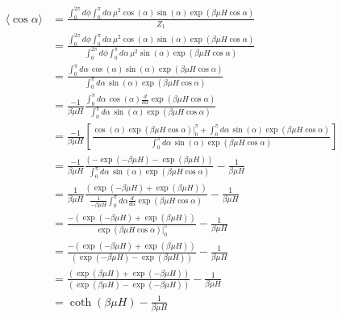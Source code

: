 \documentclass[11pt, letterpaper]{scrartcl} %
\numberwithin{equation}{section} %
\numberwithin{figure}{section} %
\numberwithin{table}{section} %
\begin{document}
\begin{align}
  \langle \cos \alpha \rangle &= \frac{\int_0^{2\pi} d\phi \int_0^\pi d\alpha \, \mu^2 \cos(\alpha) \sin (\alpha) \exp( \beta\mu H \cos \alpha)} {Z_1} \\
                              &= \frac{ \int_0^{2\pi} d\phi \int_0^\pi d\alpha \, \mu^2 \cos(\alpha) \sin(\alpha) \exp( \beta\mu H \cos \alpha)}
                                {\int_0^{2\pi} d\phi \int_0^\pi d\alpha \, \mu^2 \sin (\alpha) \exp( \beta\mu H \cos \alpha)} \\
                              &= \frac{\int_0^\pi d\alpha \, \cos(\alpha) \sin(\alpha) \exp( \beta\mu H \cos \alpha)}
                                {\int_0^\pi d\alpha \, \sin (\alpha) \exp( \beta\mu H \cos \alpha)} \\
                              &= \frac{-1}{\beta\mu H} \frac{\int_0^\pi d\alpha \, \cos(\alpha) \frac{d}{d\alpha} \exp( \beta\mu H \cos \alpha)}
                                {\int_0^\pi d\alpha \, \sin (\alpha) \exp( \beta\mu H \cos \alpha)} \\
                              &= \frac{-1}{\beta\mu H} \left[ \frac{ \cos (\alpha) \exp(\beta\mu H \cos \alpha) |_0^\pi + \int_0^\pi d\alpha \, \sin(\alpha) \exp( \beta\mu H \cos \alpha)}
                                {\int_0^\pi d\alpha \, \sin (\alpha) \exp( \beta\mu H \cos \alpha)} \right] \\
                              &= \frac{-1}{\beta\mu H} \frac{\left( -\exp(-\beta\mu H) - \exp(\beta\mu H)  \right)}
                                {\int_0^\pi d\alpha \, \sin (\alpha) \exp( \beta\mu H \cos \alpha)} - \frac{1}{\beta\mu H} \\
                              &= \frac{1}{\beta\mu H} \frac{\left( \exp(-\beta\mu H) + \exp(\beta\mu H)  \right)}
                                {\frac{1}{-\beta\mu H} \int_0^\pi d\alpha \frac{d}{d\alpha} \exp( \beta\mu H \cos \alpha)} - \frac{1}{\beta\mu H} \\
                              &= \frac{-\left( \exp(-\beta\mu H) + \exp(\beta\mu H)  \right)}
                                {\exp( \beta\mu H \cos \alpha) |_0^\pi } - \frac{1}{\beta\mu H} \\
                              &= \frac{-\left( \exp(-\beta\mu H) + \exp(\beta\mu H)  \right)}
                                {\left( \exp(-\beta\mu H) - \exp(\beta\mu H) \right)} - \frac{1}{\beta\mu H} \\
                              &= \frac{\left( \exp(\beta\mu H) + \exp(-\beta\mu H)  \right)}
                                {\left( \exp(\beta\mu H) - \exp(-\beta\mu H) \right)} - \frac{1}{\beta\mu H} \\
                              &= \coth (\beta\mu H) - \frac{1}{\beta\mu H}
\end{align}
\end{document}

